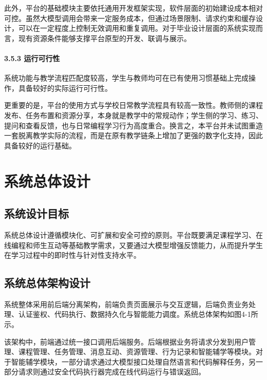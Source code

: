 此外，平台的基础模块主要依托通用开发框架实现，软件层面的初始建设成本相对可控。虽然大模型调用会带来一定服务成本，但通过场景限制、请求约束和缓存设计，可以在一定程度上控制无效调用和重复调用。对于毕业设计层面的系统实现而言，现有资源条件能够支撑平台原型的开发、联调与展示。

\subsubsection{3.5.3 运行可行性}\label{ux8fd0ux884cux53efux884cux6027}

系统功能与教学流程匹配度较高，学生与教师均可在已有使用习惯基础上完成操作，具备较好的实际运行可行性。

更重要的是，平台的使用方式与学校日常教学流程具有较高一致性。教师侧的课程发布、任务布置和资源分享，本身就是教学中的常规动作；学生侧的学习、练习、提问和查看反馈，也与日常编程学习行为高度重合。换言之，本平台并未试图重造一套脱离教学实际的流程，而是在原有教学链条上增加了更强的数字化支持，因此具备较好的运行基础。

\chapter{系统总体设计}\label{ux7cfbux7edfux603bux4f53ux8bbeux8ba1}

\section{系统设计目标}\label{ux7cfbux7edfux8bbeux8ba1ux76eeux6807}

系统总体设计遵循模块化、可扩展和安全可控的原则。平台既要满足课程学习、在线编程和师生互动等基础教学需求，又要通过大模型增强反馈能力，从而提升学生在学习过程中的即时性与针对性支持水平。

\section{系统总体架构设计}\label{ux7cfbux7edfux603bux4f53ux67b6ux6784ux8bbeux8ba1}

系统整体采用前后端分离架构，前端负责页面展示与交互逻辑，后端负责业务处理、认证鉴权、代码执行、数据持久化与智能能力调度。系统总体架构如图4-1所示。

\tikzSystemArchitectureFigure

该架构中，前端通过统一接口调用后端服务。后端根据业务将请求分发到用户管理、课程管理、任务管理、消息互动、资源管理、行为记录和智能辅学等模块。对于智能辅学模块，一部分请求通过大模型接口处理自然语言和代码解释任务，另一部分请求则通过安全代码执行器完成在线代码运行与错误返回。


